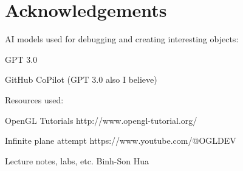 \documentclass[a4paper,oneside,12pt]{book}
\begin{document}
\section*{\Huge{Acknowledgements}}


AI models used for debugging and creating interesting objects:

GPT 3.0

GitHub CoPilot (GPT 3.0 also I believe)

Resources used:

OpenGL Tutorials http://www.opengl-tutorial.org/

Infinite plane attempt https://www.youtube.com/@OGLDEV

Lecture notes, labs, etc. Binh-Son Hua 

\newpage \tableofcontents
\renewcommand{\thechapter}{A\arabic{chapter}}
%
\end{document}
